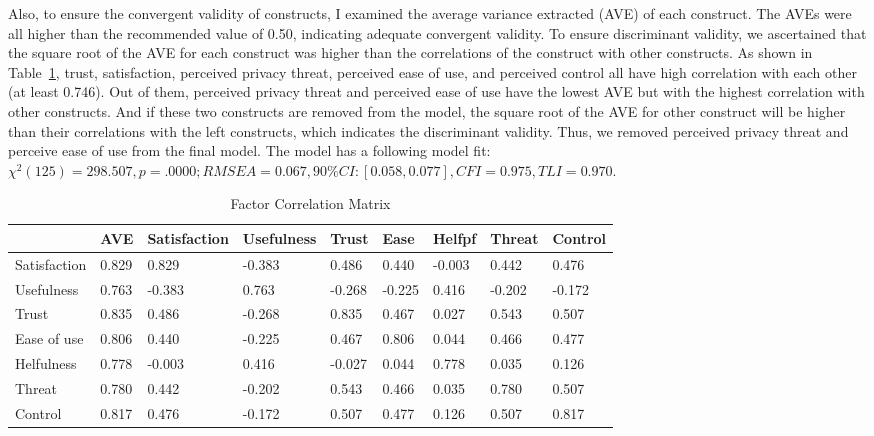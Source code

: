 Also, to ensure the convergent validity of constructs, I examined the average variance extracted (AVE) of each construct. The AVEs were all higher than the recommended value of 0.50, indicating adequate convergent validity. To ensure discriminant validity, we ascertained that the square root of the AVE for each construct was higher than the correlations of the construct with other constructs. As shown in Table~\ref{tab:CorrelationMatrix}, trust, satisfaction, perceived privacy threat, perceived ease of use, and perceived control all have high correlation with each other (at least 0.746). Out of them, perceived privacy threat and perceived ease of use have the lowest AVE but with the highest correlation with other constructs. And if these two constructs are removed from the model, the square root of the AVE for other construct will be higher than their correlations with the left constructs, which indicates the discriminant validity. Thus, we removed perceived privacy threat and perceive ease of use from the final model.
The model has a following model fit: ${\chi}^{2}(125) = 298.507, p = .0000; RMSEA =
0.067, 90\% CI: [0.058, 0.077], CFI = 0.975, TLI = 0.970$.
\begin{table}[]
	\begin{tabular}{l|l|l|l|l|l|l|l|l}
		\hline
		& AVE   & Satisfaction & Usefulness & Trust  & Ease   & Helfpf & Threat & Control \\ \hline
		Satisfaction & 0.829 & 0.829        & -0.383     & 0.486  & 0.440  & -0.003       & 0.442  & 0.476   \\ \hline
		Usefulness   & 0.763 & -0.383       & 0.763      & -0.268 & -0.225 & 0.416        & -0.202 & -0.172  \\ \hline
		Trust        & 0.835 & 0.486        & -0.268     & 0.835  & 0.467  & 0.027        & 0.543  & 0.507   \\ \hline
		Ease of use  & 0.806 & 0.440        & -0.225     & 0.467  & 0.806  & 0.044        & 0.466  & 0.477   \\ \hline
		Helfulness   & 0.778 & -0.003       & 0.416      & -0.027 & 0.044  & 0.778        & 0.035  & 0.126   \\ \hline
		Threat       & 0.780 & 0.442        & -0.202     & 0.543  & 0.466  & 0.035        & 0.780  & 0.507   \\ \hline
		Control      & 0.817 & 0.476        & -0.172     & 0.507  & 0.477  & 0.126        & 0.507  & 0.817   \\ \hline
	\end{tabular}
	\caption {Factor Correlation Matrix}\label{tab:CorrelationMatrix}
\end{table}

